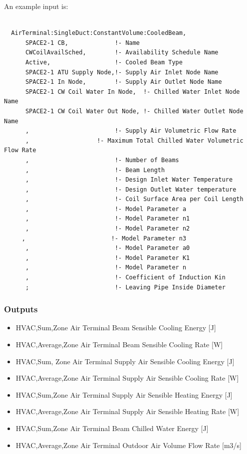 An example input is:

\begin{lstlisting}

  AirTerminal:SingleDuct:ConstantVolume:CooledBeam,
      SPACE2-1 CB,             !- Name
      CWCoilAvailSched,        !- Availability Schedule Name
      Active,                  !- Cooled Beam Type
      SPACE2-1 ATU Supply Node,!- Supply Air Inlet Node Name
      SPACE2-1 In Node,        !- Supply Air Outlet Node Name
      SPACE2-1 CW Coil Water In Node,  !- Chilled Water Inlet Node Name
      SPACE2-1 CW Coil Water Out Node, !- Chilled Water Outlet Node Name
      ,                        !- Supply Air Volumetric Flow Rate
      ,                   !- Maximum Total Chilled Water Volumetric Flow Rate
      ,                        !- Number of Beams
      ,                        !- Beam Length
      ,                        !- Design Inlet Water Temperature
      ,                        !- Design Outlet Water temperature
      ,                        !- Coil Surface Area per Coil Length
      ,                        !- Model Parameter a
      ,                        !- Model Parameter n1
      ,                        !- Model Parameter n2
     ,                        !- Model Parameter n3
      ,                        !- Model Parameter a0
      ,                        !- Model Parameter K1
      ,                        !- Model Parameter n
      ,                        !- Coefficient of Induction Kin
      ;                        !- Leaving Pipe Inside Diameter
\end{lstlisting}

\subsubsection{Outputs}\label{outputs-11}

\begin{itemize}
\item
  HVAC,Sum,Zone Air Terminal Beam Sensible Cooling Energy {[}J{]}
\item
  HVAC,Average,Zone Air Terminal Beam Sensible Cooling Rate {[}W{]}
\item
  HVAC,Sum, Zone Air Terminal Supply Air Sensible Cooling Energy {[}J{]}
\item
  HVAC,Average,Zone Air Terminal Supply Air Sensible Cooling Rate {[}W{]}
\item
  HVAC,Sum,Zone Air Terminal Supply Air Sensible Heating Energy {[}J{]}
\item
  HVAC,Average,Zone Air Terminal Supply Air Sensible Heating Rate {[}W{]}
\item
  HVAC,Sum,Zone Air Terminal Beam Chilled Water Energy {[}J{]}
\item
  HVAC,Average,Zone Air Terminal Outdoor Air Volume Flow Rate {[}m3/s{]}
\end{itemize}

